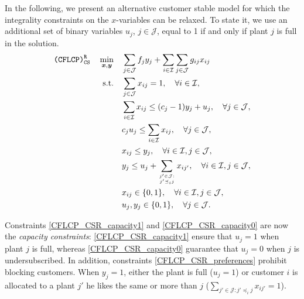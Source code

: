 \documentclass[preprint,11pt,authoryear]{elsarticle}
\def\J{\mathcal{J}}
\def\I{\mathcal{I}}
\begin{document}
In the following, we present an alternative customer stable model for which the integrality constraints on the $x$-variables can be relaxed. To state it, we use an additional set of binary variables $u_j$, $j\in \J$, equal to 1 if and only if plant $j$ is full in the solution. 
\begin{subequations} \label{CFLCP_CSR}
\begin{align}
\texttt{(CFLCP)}_{\texttt{CS}}^\texttt{R} \quad \min_{\boldsymbol{x},\boldsymbol{y}} \quad & \sum_{j\in \J} f_jy_j + \sum_{i\in \I} \sum_{j\in \J} g_{ij}x_{ij}  \label{CFLCP_CSR_FO} \\
\text{s.t.} \quad &\sum_{j\in \J} x_{ij} = 1, \quad \forall i\in \I, \label{CFLCP_CSR_allocation}\\
& \sum_{i\in \I} x_{ij}  \le (c_j-1)y_j + u_j, \quad \forall j\in\J, \label{CFLCP_CSR_capacity1}\\
& c_ju_j \le \sum_{i\in \I} x_{ij}, \quad \forall j\in\J, \label{CFLCP_CSR_capacity0}\\
&x_{ij} \le y_j, \quad \forall i \in \I, j \in \J, \label{CFLCP_CSR_allocationOpenPlants} \\
&  y_j \le u_j + \sum_{j'\in \J:\atop j'\preceq_i j} x_{ij'}, \quad \forall i\in \I, j\in \J, \label{CFLCP_CSR_preferences} \\
& x_{ij} \in \{0,1\}, \quad \forall i \in \I, j \in \J,  \label{CFLCP_CSR_xbinarias} \\
& u_j, y_j \in \{0,1\}, \quad \forall j \in \J.  \label{CFLCP_CSR_ybinarias}
\end{align}
\end{subequations}

Constraints \eqref{CFLCP_CSR_capacity1} and \eqref{CFLCP_CSR_capacity0} are now the \emph{capacity constraints}: \eqref{CFLCP_CSR_capacity1} ensure that $u_j=1$ when plant $j$ is full, whereas \eqref{CFLCP_CSR_capacity0} guarantee that $u_j=0$ when $j$ is undersubscribed. In addition, constraints \eqref{CFLCP_CSR_preferences} prohibit blocking customers. When $y_j=1$, either the plant is full ($u_j=1$) or customer $i$ is allocated to a plant $j'$ he likes the same or more than $j$ ($\sum_{j'\in \J: j'\preceq_i j} x_{ij'}=1$). 
\end{document}
